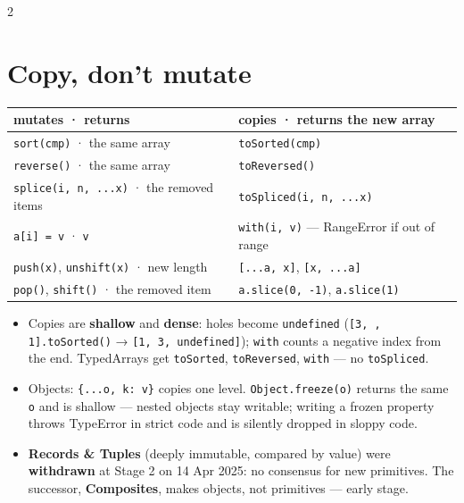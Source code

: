 \documentclass[8pt]{extarticle}
\begin{document}
\begin{multicols}{2}
\section{Copy, don't mutate}
{\scriptsize\setlength{\tabcolsep}{2pt}
\begin{tabular}{@{}>{\raggedright\arraybackslash}p{36mm}>{\raggedright\arraybackslash}p{41mm}@{}}
\toprule
\textbf{mutates · returns} & \textbf{copies · returns the new array}\\
\midrule
\texttt{sort(cmp)} · the same array & \texttt{toSorted(cmp)}\\
\texttt{reverse()} · the same array & \texttt{toReversed()}\\
\texttt{splice(i, n, ...x)} · the removed items & \texttt{toSpliced(i, n, ...x)}\\
\texttt{a[i] = v} · \texttt{v} & \texttt{with(i, v)} — RangeError if out of range\\
\texttt{push(x)}, \texttt{unshift(x)} · new length & \texttt{[...a, x]}, \texttt{[x, ...a]}\\
\texttt{pop()}, \texttt{shift()} · the removed item & \texttt{a.slice(0, -1)}, \texttt{a.slice(1)}\\
\bottomrule
\end{tabular}}
\begin{itemize}
  \item Copies are \textbf{shallow} and \textbf{dense}: holes become \texttt{undefined}
        (\texttt{[3, , 1].toSorted()} → \texttt{[1, 3, undefined]}); \texttt{with} counts a
        negative index from the end. TypedArrays get \texttt{toSorted}, \texttt{toReversed},
        \texttt{with} — no \texttt{toSpliced}.
  \item Objects: \texttt{\{...o, k: v\}} copies one level. \texttt{Object.freeze(o)} returns
        the same \texttt{o} and is shallow — nested objects stay writable; writing a frozen
        property throws TypeError in strict code and is silently dropped in sloppy code.
  \item \textbf{Records \& Tuples} (deeply immutable, compared by value) were
        \textbf{withdrawn} at Stage 2 on 14 Apr 2025: no consensus for new primitives. The
        successor, \textbf{Composites}, makes objects, not primitives — early stage.
\end{itemize}

\columnbreak


\end{multicols}
\end{document}
